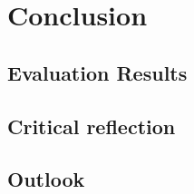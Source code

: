 \chapter{Conclusion}

\section{Evaluation Results}

\section{Critical reflection}

\section{Outlook}
